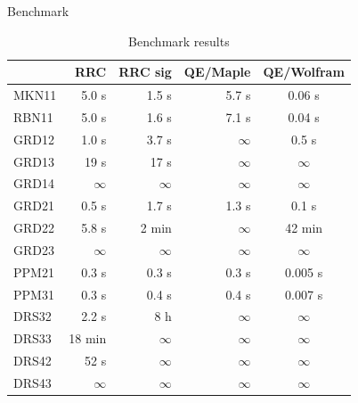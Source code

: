 \documentclass[final]{beamer}
\newlength{\sepwidth}
\newlength{\colwidth}
\newcommand{\separatorcolumn}{\begin{column}{\sepwidth}\end{column}}
\begin{document}
\begin{frame}[t]
\begin{columns}[t]
\begin{column}{\colwidth}
\begin{block}{Benchmark}
                \begin{table}
                    \centering
                    \begin{tabular}{l r r r c}
                        \toprule
                                       & \textbf{RRC} & \textbf{RRC sig} & \textbf{QE/Maple} & \textbf{QE/Wolfram} \\
                        \midrule
                        \textsf{MKN11} & 5.0 s        & 1.5 s            & 5.7 s             & 0.06 s              \\
                        \textsf{RBN11} & 5.0 s        & 1.6 s            & 7.1 s             & 0.04 s              \\
                        \textsf{GRD12} & 1.0 s        & 3.7 s            & $\infty$          & 0.5 s               \\
                        \textsf{GRD13} & 19 s         & 17 s             & $\infty$          & $\infty$            \\
                        \textsf{GRD14} & $\infty$     & $\infty$         & $\infty$          & $\infty$            \\
                        \textsf{GRD21} & 0.5 s        & 1.7 s            & 1.3 s             & 0.1 s               \\
                        \textsf{GRD22} & 5.8 s        & 2 min            & $\infty$          & 42 min              \\
                        \textsf{GRD23} & $\infty$     & $\infty$         & $\infty$          & $\infty$            \\
                        \textsf{PPM21} & 0.3 s        & 0.3 s            & 0.3 s             & 0.005 s             \\
                        \textsf{PPM31} & 0.3 s        & 0.4 s            & 0.4 s             & 0.007 s             \\
                        \textsf{DRS32} & 2.2 s        & 8 h              & $\infty$          & $\infty$            \\
                        \textsf{DRS33} & 18 min       & $\infty$         & $\infty$          & $\infty$            \\
                        \textsf{DRS42} & 52 s         & $\infty$         & $\infty$          & $\infty$            \\
                        \textsf{DRS43} & $\infty$     & $\infty$         & $\infty$          & $\infty$
                        \bottomrule
                    \end{tabular}
                    \caption{Benchmark results}
                \end{table}

            \end{block}

        \end{column}

        \separatorcolumn
    \end{columns}
\end{frame}
\end{document}
